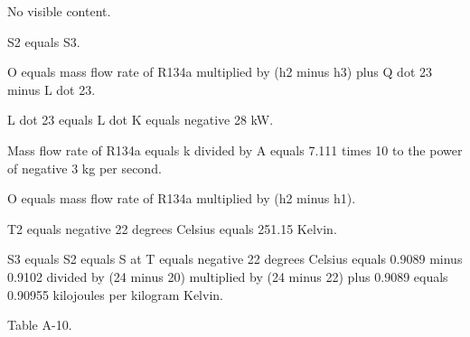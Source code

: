 No visible content.

S2 equals S3.  

O equals mass flow rate of R134a multiplied by (h2 minus h3) plus Q dot 23 minus L dot 23.  

L dot 23 equals L dot K equals negative 28 kW.  

Mass flow rate of R134a equals k divided by A equals 7.111 times 10 to the power of negative 3 kg per second.  

O equals mass flow rate of R134a multiplied by (h2 minus h1).  

T2 equals negative 22 degrees Celsius equals 251.15 Kelvin.  

S3 equals S2 equals S at T equals negative 22 degrees Celsius equals 0.9089 minus 0.9102 divided by (24 minus 20) multiplied by (24 minus 22) plus 0.9089 equals 0.90955 kilojoules per kilogram Kelvin.  

Table A-10.